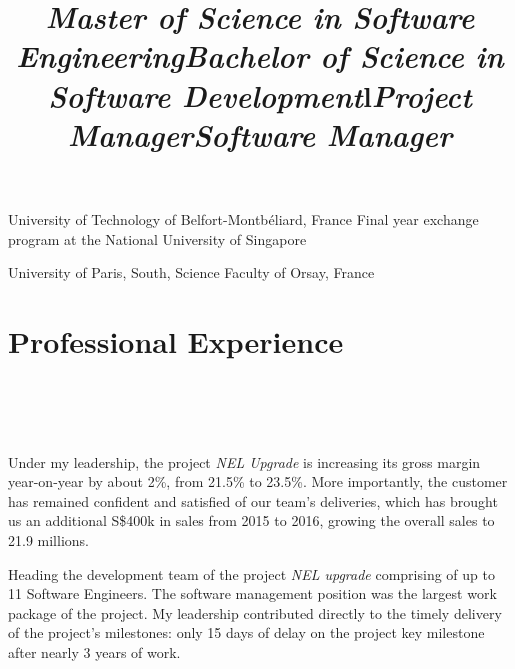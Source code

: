 \documentclass[overlapped,line,letterpaper]{res}
\begin{document}
\begin{resume}
  \title{\em Master of Science in Software Engineering}
  \begin{position}
    University of Technology of Belfort-Montb\'{e}liard, France\newline
    Final year exchange program at the National University of Singapore
  \end{position}

  \title{\em Bachelor of Science in Software Development}
  \begin{position}
    University of Paris, South, Science Faculty of Orsay, France
  \end{position}


  \section{\bf Professional Experience}


  \begin{format}
    \title{l}\\
    \\
    \body\\
  \end{format}

  \title{\em Project Manager}
  \begin{position}
    Under my leadership, the project {\em NEL Upgrade} is increasing its gross
    margin year-on-year by about 2\%, from 21.5\% to 23.5\%. More importantly,
    the customer has remained confident and satisfied of our team's deliveries,
    which has brought us an additional S\$400k in sales from 2015 to 2016,
    growing the overall sales to 21.9 millions.
  \end{position}

  \title{\em Software Manager}
  \begin{position}
    Heading the development team of the project {\em NEL upgrade} comprising of
    up to 11 Software Engineers. The software management position was the
    largest work package of the project. My leadership contributed directly to
    the timely delivery of the project's milestones: only 15 days of delay on the
    project key milestone after nearly 3 years of work.
  \end{position}


\end{resume}
\end{document}
